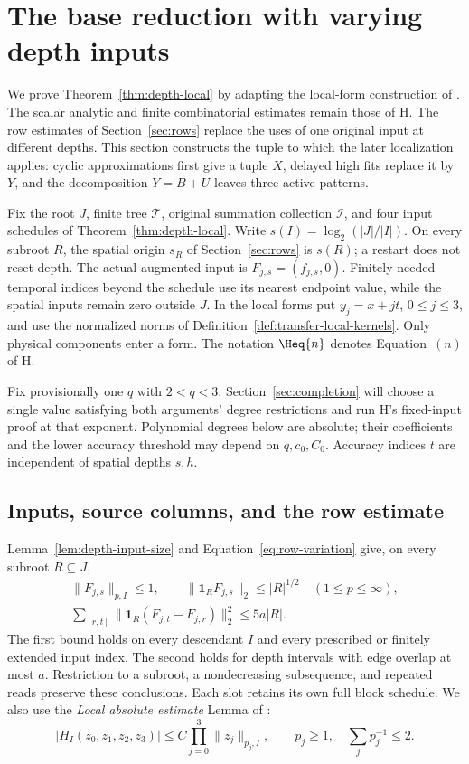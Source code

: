 \section{The base reduction with varying depth inputs}
\label{sec:base}

We prove Theorem~\ref{thm:depth-local} by adapting the local-form
construction of \cite[Sections~3--10]{H}.  The scalar analytic and
finite combinatorial estimates remain those of H.  The row estimates
of Section~\ref{sec:rows} replace the uses of one original input at
different depths.  This section constructs the tuple to which the
later localization applies: cyclic approximations first give a tuple
\(X\), delayed high fits replace it by \(Y\), and the decomposition
\(Y=B+U\) leaves three active patterns.

Fix the root \(J\), finite tree \(\mathcal T\), original summation
collection \(\mathcal I\), and four input schedules of
Theorem~\ref{thm:depth-local}.  Write
\(s(I)=\log_2(|J|/|I|)\).  On every subroot \(R\), the spatial origin
\(s_R\) of Section~\ref{sec:rows} is \(s(R)\); a restart does not reset
depth.  The actual augmented input is \(F_{j,s}=(f_{j,s},0)\).
Finitely needed temporal indices beyond the schedule use its nearest
endpoint value, while the spatial inputs remain zero outside \(J\).
In the local forms put \(y_j=x+jt\), \(0\le j\le3\), and use the
normalized norms of Definition~\ref{def:transfer-local-kernels}.
Only physical components enter a form.  The notation \(\Heq{n}\)
denotes Equation~\((n)\) of H.

Fix provisionally one \(q\) with \(2<q<3\).  Section~\ref{sec:completion}
will choose a single value satisfying both arguments' degree restrictions
and run H's fixed-input proof at that exponent.  Polynomial degrees below are
absolute; their coefficients and the lower accuracy threshold may
depend on \(q,c_0,C_0\).  Accuracy indices \(t\) are independent of
spatial depths \(s,h\).

\subsection{Inputs, source columns, and the row estimate}

Lemma~\ref{lem:depth-input-size} and Equation~\eqref{eq:row-variation}
give, on every subroot \(R\subseteq J\),
\begin{gather}
 \|F_{j,s}\|_{p,I}\le1,\qquad
 \|\mathbf1_R F_{j,s}\|_2\le |R|^{1/2}
 \quad(1\le p\le\infty),                                      \label{eq:h-input-size}\\
 \sum_{[r,t]}\|\mathbf1_R(F_{j,t}-F_{j,r})\|_2^2
       \le5a|R|.                                               \label{eq:h-input-variation}
\end{gather}
The first bound holds on every descendant \(I\) and every prescribed
or finitely extended input index.  The second holds for depth intervals
with edge overlap at most \(a\).  Restriction to a subroot, a
nondecreasing subsequence, and repeated reads preserve these
conclusions.  Each slot retains its own full block schedule.  We also
use the \emph{Local absolute estimate} Lemma of \cite[Section~2]{H}:
\[
 |H_I(z_0,z_1,z_2,z_3)|
 \le C\prod_{j=0}^3\|z_j\|_{p_j,I},
 \qquad p_j\ge1,\quad \sum_jp_j^{-1}\le2.
\]

